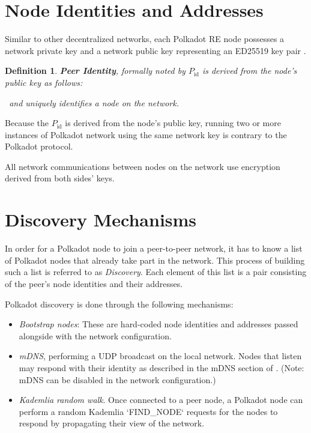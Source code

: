 \documentclass{book}
\newcommand{\tmem}[1]{{\em #1\/}}
\newcommand{\tmop}[1]{\ensuremath{\operatorname{#1}}}
\newcommand{\tmstrong}[1]{\textbf{#1}}
\newtheorem{definition}{Definition}
\newtheorem{definition}{Definition}
\begin{document}
\section{Node Identities and Addresses}

Similar to other decentralized networks, each Polkadot RE node possesses a
network private key and a network public key representing an ED25519 key pair
{\cite{liusvaara_edwards-curve_2017}}.

{}

\begin{definition}
  {\tmstrong{Peer Identity}}, formally noted by $P_{\tmop{id}}$ is derived
  from the node's public key as follows:
  
  {\todo{SPEC: How to derive $P_{\tmop{id}}$}} \ and uniquely identifies a
  node on the network.
\end{definition}

Because the $P_{\tmop{id}}$ is derived from the node's public key, running two
or more instances of Polkadot network using the same network key is contrary
to the Polkadot protocol.

All network communications between nodes on the network use encryption derived
from both sides' keys.

{}

\section{Discovery Mechanisms}

In order for a Polkadot node to join a peer-to-peer network, it has to know a
list of Polkadot nodes that already take part in the network. This process of
building such a list is referred to as {\tmem{Discovery}}. Each element of
this list is a pair consisting of the peer's node identities and their
addresses.

{}

Polkadot discovery is done through the following mechanisms:
\begin{itemize}
  \item {\tmem{Bootstrap nodes}}: These are hard-coded node identities and
  addresses passed alongside with the network configuration.
  
  \item {\tmem{mDNS}}, performing a UDP broadcast on the local network. Nodes
  that listen may respond with their identity as described in the mDNS section
  of {\cite{protocol_labs_libp2p_2019}}. (Note: mDNS can be disabled in the
  network configuration.)
  
  \item {\tmem{Kademlia random walk}}. Once connected to a peer node, a
  Polkadot node can perform a random Kademlia `FIND\_NODE` requests for the
  nodes {} to respond by propagating their view of the
  network.
  
  \ 
\end{itemize}
\end{document}
